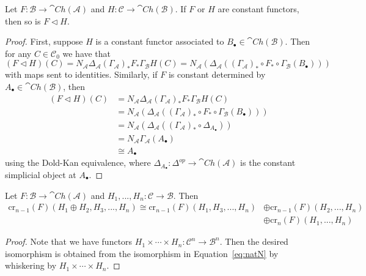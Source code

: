 \begin{lem}[label=lem:constComp]
    Let $F:\mathcal{B}\to \cat{Ch}(\mathcal{A})$ and $H:\mathcal{C}\to \cat{Ch}(\mathcal{B})$. If $F$ or $H$ are constant functors, then so is $F\lhd H$.
\end{lem}
\begin{proof}
    First, suppose $H$ is a constant functor associated to $B_\bullet \in \cat{Ch}(\mathcal{B})$. Then for any $C \in \mathcal{C}_0$ we have that 
    \begin{equation*}
        (F\lhd H)(C) = N_\mathcal{A}\Delta_\mathcal{A}(\Gamma_\mathcal{A})_*F_*\Gamma_\mathcal{B} H(C) = N_\mathcal{A}(\Delta_\mathcal{A}((\Gamma_\mathcal{A})_*\circ F_*\circ \Gamma_\mathcal{B}(B_\bullet))) 
    \end{equation*}
    with maps sent to identities. Similarly, if $F$ is constant determined by $A_\bullet \in \cat{Ch}(\mathcal{B})$, then 
    \begin{align*}
        (F\lhd H)(C) &= N_\mathcal{A}\Delta_\mathcal{A}(\Gamma_\mathcal{A})_*F_*\Gamma_\mathcal{B} H(C) \\
        &= N_\mathcal{A}(\Delta_\mathcal{A}((\Gamma_\mathcal{A})_*\circ F_*\circ \Gamma_\mathcal{B}(B_\bullet)))  \\
        &= N_\mathcal{A}(\Delta_\mathcal{A}((\Gamma_\mathcal{A})_*\circ \Delta_{A_\bullet})) \\
        &= N_\mathcal{A}\Gamma_\mathcal{A}(A_\bullet) \\
        &\cong A_\bullet
    \end{align*}
    using the Dold-Kan equivalence, where $\Delta_{A_\bullet}:\Delta^{op}\to \cat{Ch}(\mathcal{A})$ is the constant simplicial object at $A_\bullet$.
\end{proof}

\begin{lem}[label=lem:dirComp]
    Let $F:\mathcal{B}\to \cat{Ch}(\mathcal{A})$ and $H_1,...,H_n:\mathcal{C}\to \mathcal{B}$. Then 
    \begin{align*}
        \text{cr}_{n-1}(F)(H_1\oplus H_2,H_3,...,H_n) \cong \text{cr}_{n-1}(F)(H_1,H_3,...,H_n)&\oplus \text{cr}_{n-1}(F)(H_2,...,H_n) \\
        &\oplus \text{cr}_n(F)(H_1,...,H_n) 
    \end{align*}
\end{lem}
\begin{proof}
    Note that we have functors $H_1\times \cdots \times H_n:\mathcal{C}^n\to \mathcal{B}^n$. Then the desired isomorphism is obtained from the isomorphism in Equation~\eqref{eq:natN} by whiskering by $H_1\times \cdots \times H_n$.
\end{proof}

